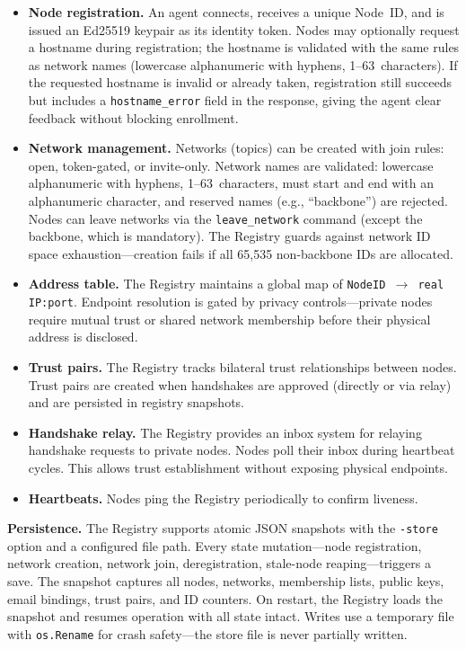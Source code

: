 \documentclass[11pt,a4paper]{article}
\begin{document}
\begin{itemize}
    \item \textbf{Node registration.} An agent connects, receives a unique Node~ID, and is issued an Ed25519 keypair as its identity token. Nodes may optionally request a hostname during registration; the hostname is validated with the same rules as network names (lowercase alphanumeric with hyphens, 1--63~characters). If the requested hostname is invalid or already taken, registration still succeeds but includes a \texttt{hostname\_error} field in the response, giving the agent clear feedback without blocking enrollment.
    \item \textbf{Network management.} Networks (topics) can be created with join rules: open, token-gated, or invite-only. Network names are validated: lowercase alphanumeric with hyphens, 1--63~characters, must start and end with an alphanumeric character, and reserved names (e.g., ``backbone'') are rejected. Nodes can leave networks via the \texttt{leave\_network} command (except the backbone, which is mandatory). The Registry guards against network ID space exhaustion---creation fails if all 65{,}535 non-backbone IDs are allocated.
    \item \textbf{Address table.} The Registry maintains a global map of \mbox{\texttt{NodeID $\rightarrow$ real IP:port}}. Endpoint resolution is gated by privacy controls---private nodes require mutual trust or shared network membership before their physical address is disclosed.
    \item \textbf{Trust pairs.} The Registry tracks bilateral trust relationships between nodes. Trust pairs are created when handshakes are approved (directly or via relay) and are persisted in registry snapshots.
    \item \textbf{Handshake relay.} The Registry provides an inbox system for relaying handshake requests to private nodes. Nodes poll their inbox during heartbeat cycles. This allows trust establishment without exposing physical endpoints.
    \item \textbf{Heartbeats.} Nodes ping the Registry periodically to confirm liveness.
\end{itemize}

\textbf{Persistence.} The Registry supports atomic JSON snapshots with the \texttt{-store} option and a configured file path. Every state mutation---node registration, network creation, network join, deregistration, stale-node reaping---triggers a save. The snapshot captures all nodes, networks, membership lists, public keys, email bindings, trust pairs, and ID counters. On restart, the Registry loads the snapshot and resumes operation with all state intact. Writes use a temporary file with \texttt{os.Rename} for crash safety---the store file is never partially written.
\end{document}
